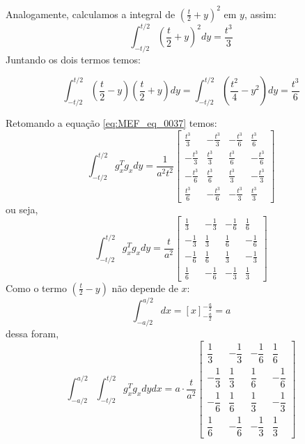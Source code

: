 \documentclass[
12pt,
a4paper,
oneside,
chapter=TITLE,
sumario=tradicional
]{abntex2}
\begin{document}
Analogamente, calculamos a integral de $(\frac{t}{2} + y)^2$ em $y$, assim:
\begin{equation}
\int_{-t/2}^{t/2} \left(\frac{t}{2} + y\right)^2 dy = \frac{t^3}{3}
	\label{eq:MEF_eq_0039}  
\end{equation}
Juntando os dois termos temos:

\begin{equation}
\int_{-t/2}^{t/2} \left(\frac{t}{2} - y\right)\left(\frac{t}{2} + y\right) dy
= \int_{-t/2}^{t/2} \left(\frac{t^2}{4} - y^2\right) dy
=
\frac{t^3}{6}  
	\label{eq:MEF_eq_0040}  
\end{equation}

Retomando a equação \ref{eq:MEF_eq_0037} temos:
$$  
\int_{-t/2}^{t/2} g_x^T g_x  dy
=
\frac{1}{a^2 t^2}  
\begin{bmatrix}  
	\frac{t^3}{3} & -\frac{t^3}{3} & -\frac{t^3}{6} & \frac{t^3}{6} \\  
	-\frac{t^3}{3} & \frac{t^3}{3} & \frac{t^3}{6} & -\frac{t^3}{6} \\  
	-\frac{t^3}{6} & \frac{t^3}{6} & \frac{t^3}{3} & -\frac{t^3}{3} \\  
	\frac{t^3}{6} & -\frac{t^3}{6} & -\frac{t^3}{3} & \frac{t^3}{3}  
\end{bmatrix}  
$$
ou seja,
$$  
\int_{-t/2}^{t/2} g_x^T g_x  dy
=
\frac{t}{a^2}  
\begin{bmatrix}  
	\frac{1}{3} & -\frac{1}{3} & -\frac{1}{6} & \frac{1}{6} \\  
	-\frac{1}{3} & \frac{1}{3} & \frac{1}{6} & -\frac{1}{6} \\  
	-\frac{1}{6} & \frac{1}{6} & \frac{1}{3} & -\frac{1}{3} \\  
	\frac{1}{6} & -\frac{1}{6} & -\frac{1}{3} & \frac{1}{3}  
\end{bmatrix}  
$$
Como o termo $\left(\frac{t}{2} - y\right)$ não depende de $x$:
$$
\int_{-a/2}^{a/2} dx = [x]_{-\frac{a}{2}}^{-\frac{a}{2}} = a
$$
dessa foram,
$$  
\int_{-a/2}^{a/2} \int_{-t/2}^{t/2} g_x^T g_x  dydx
=
a \cdot  
\frac{t}{a^2}  
\begin{bmatrix}  
	\dfrac{1}{3} & -\dfrac{1}{3} & -\dfrac{1}{6} & \dfrac{1}{6} \\  
	-\dfrac{1}{3} & \dfrac{1}{3} & \dfrac{1}{6} & -\dfrac{1}{6} \\  
	-\dfrac{1}{6} & \dfrac{1}{6} & \dfrac{1}{3} & -\dfrac{1}{3} \\  
	\dfrac{1}{6} & -\dfrac{1}{6} & -\dfrac{1}{3} & \dfrac{1}{3}  
\end{bmatrix}  
$$
\end{document}
